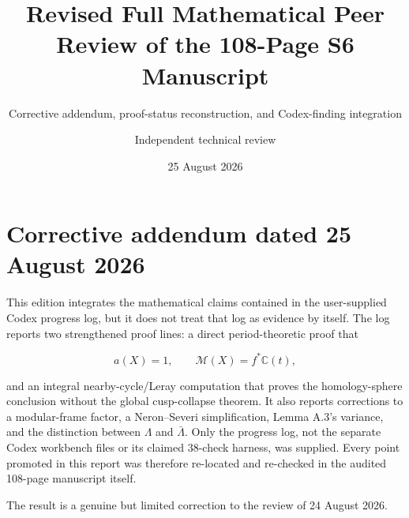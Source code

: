 \documentclass[
  10pt,
  letterpaper,
]{article}
\title{Revised Full Mathematical Peer Review of the 108-Page S6
Manuscript}
\subtitle{Corrective addendum, proof-status reconstruction, and
Codex-finding integration}
\author{Independent technical review}
\date{25 August 2026}
\begin{document}
\maketitle

{
\hypersetup{linkcolor=}
\setcounter{tocdepth}{3}
\tableofcontents
}
\section{Corrective addendum dated 25 August
2026}\label{corrective-addendum-dated-25-august-2026}

This edition integrates the mathematical claims contained in the
user-supplied Codex progress log, but it does not treat that log as
evidence by itself. The log reports two strengthened proof lines: a
direct period-theoretic proof that

\[
a(X)=1,
\qquad
\mathcal M(X)=f^*\mathbb C(t),
\]

and an integral nearby-cycle/Leray computation that proves the
homology-sphere conclusion without the global cusp-collapse theorem. It
also reports corrections to a modular-frame factor, a Neron--Severi
simplification, Lemma A.3's variance, and the distinction between
\(\Lambda\) and \(\bar\Lambda\). Only the progress log, not the separate
Codex workbench files or its claimed 38-check harness, was supplied.
Every point promoted in this report was therefore re-located and
re-checked in the audited 108-page manuscript itself.

The result is a genuine but limited correction to the review of 24
August 2026.
\end{document}
